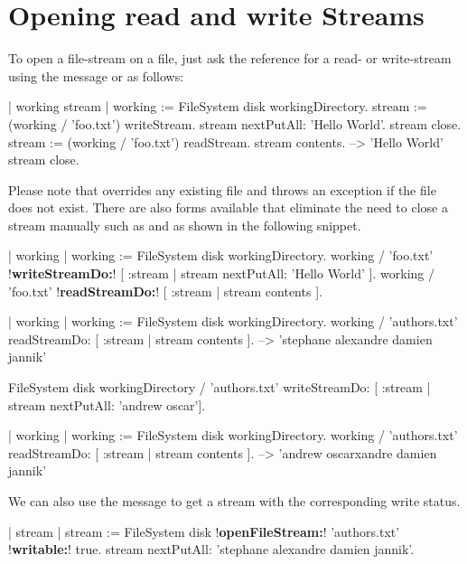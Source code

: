 \documentclass[a4paper,10pt,twoside]{book}
\begin{document}
\section{Opening read and write Streams}
To open a file-stream on a file, just ask the reference for a read- or write-stream using the message  or  as follows:

\begin{code}{}
| working stream |
working := FileSystem disk workingDirectory.
stream := (working / 'foo.txt') writeStream.
stream nextPutAll: 'Hello World'.
stream close.
stream := (working / 'foo.txt') readStream.
stream contents.			--> 'Hello World'
stream close.
\end{code}

Please note that  overrides any existing file and  throws an exception if the file does not exist. There are also forms available that eliminate the need to close a stream manually such as  and  as shown in the following snippet.

\begin{code}{}
| working  |
working := FileSystem disk workingDirectory.
working / 'foo.txt' !\textbf{writeStreamDo:}! [ :stream | stream nextPutAll: 'Hello World' ].
working / 'foo.txt' !\textbf{readStreamDo:}! [ :stream | stream contents ].
\end{code}

\begin{code}{}
| working |
working := FileSystem disk workingDirectory.
working / 'authors.txt' readStreamDo: [ :stream | stream contents ]. 
   --> 'stephane alexandre damien jannik'
   
FileSystem disk workingDirectory / 'authors.txt' 
	writeStreamDo: [ :stream | stream nextPutAll: 'andrew oscar'].

| working |
working := FileSystem disk workingDirectory.
working / 'authors.txt' readStreamDo: [ :stream | stream contents ]. 
	--> 'andrew oscarxandre damien jannik'
\end{code}


We can also use the message  to get a stream with the corresponding
write status.

\begin{code}{}
| stream |
stream := FileSystem disk !\textbf{openFileStream:}! 'authors.txt' !\textbf{writable:}! true.
stream nextPutAll: 'stephane alexandre damien jannik'.
\end{code}	
\end{document}
